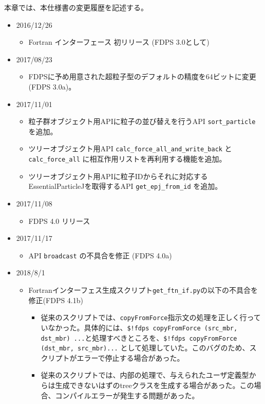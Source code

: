 本章では、本仕様書の変更履歴を記述する。

\begin{itemize}[leftmargin=*,itemsep=-1ex]

\item 2016/12/26
\begin{itemize}
\item Fortran インターフェース 初リリース (FDPS 3.0として)
\end{itemize}

\item 2017/08/23
\begin{itemize}
\item FDPSに予め用意された超粒子型のデフォルトの精度を64ビットに変更 (FDPS 3.0a)。
\end{itemize}

\item 2017/11/01
\begin{itemize}
\item 粒子群オブジェクト用APIに粒子の並び替えを行うAPI \texttt{sort\_particle} を追加。
\item ツリーオブジェクト用API \texttt{calc\_force\_all\_and\_write\_back} と \texttt{calc\_force\_all} に相互作用リストを再利用する機能を追加。
\item ツリーオブジェクト用APIに粒子IDからそれに対応するEssentialParticleJを取得するAPI \texttt{get\_epj\_from\_id} を追加。
\end{itemize}

\item 2017/11/08
\begin{itemize}
\item FDPS 4.0 リリース
\end{itemize}

\item 2017/11/17
\begin{itemize}
\item API \texttt{broadcast} の不具合を修正 (FDPS 4.0a)
\end{itemize}

\item 2018/8/1
\begin{itemize}
\item Fortranインターフェス生成スクリプト\texttt{get\_ftn\_if.py}の以下の不具合を修正(FDPS 4.1b)
\begin{itemize}
\item 従来のスクリプトでは、\texttt{copyFromForce}指示文の処理を正しく行っていなかった。具体的には、\texttt{\$!fdps copyFromForce (src\_mbr, dst\_mbr) ...}と処理すべきところを、\texttt{\$!fdps copyFromForce (dst\_mbr, src\_mbr)...} として処理していた。このバグのため、スクリプトがエラーで停止する場合があった。
\item 従来のスクリプトでは、内部の処理で、与えられたユーザ定義型からは生成できないはずのtreeクラスを生成する場合があった。この場合、コンパイルエラーが発生する問題があった。
\end{itemize}
\end{itemize}



\end{itemize}
